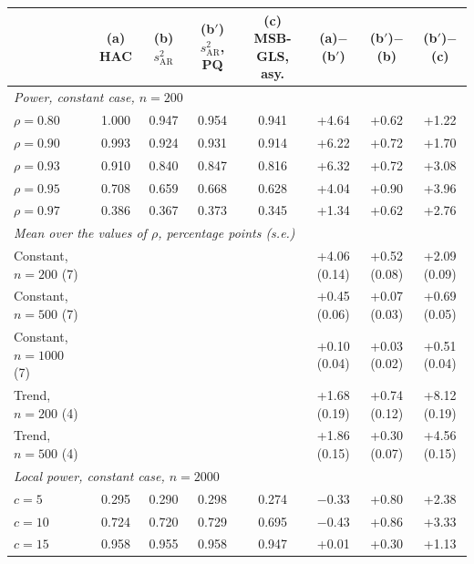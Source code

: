 \begin{tabular}{lccccccc}
\toprule
& (a) HAC & (b) $s^2_{\mathrm{AR}}$ & (b$'$) $s^2_{\mathrm{AR}}$, PQ & (c) MSB-GLS, asy. & (a)$-$(b$'$) & (b$'$)$-$(b) & (b$'$)$-$(c)\\
\midrule
\multicolumn{8}{l}{\emph{Power, constant case, $n = 200$}}\\
$\rho = 0.80$ & 1.000 & 0.947 & 0.954 & 0.941 & +4.64 & +0.62 & +1.22 \\
$\rho = 0.90$ & 0.993 & 0.924 & 0.931 & 0.914 & +6.22 & +0.72 & +1.70 \\
$\rho = 0.93$ & 0.910 & 0.840 & 0.847 & 0.816 & +6.32 & +0.72 & +3.08 \\
$\rho = 0.95$ & 0.708 & 0.659 & 0.668 & 0.628 & +4.04 & +0.90 & +3.96 \\
$\rho = 0.97$ & 0.386 & 0.367 & 0.373 & 0.345 & +1.34 & +0.62 & +2.76 \\
\multicolumn{8}{l}{\emph{Mean over the values of $\rho$, percentage points (s.e.)}}\\
Constant, $n = 200$ (7) &  &  &  &  & +4.06 (0.14) & +0.52 (0.08) & +2.09 (0.09) \\
Constant, $n = 500$ (7) &  &  &  &  & +0.45 (0.06) & +0.07 (0.03) & +0.69 (0.05) \\
Constant, $n = 1000$ (7) &  &  &  &  & +0.10 (0.04) & +0.03 (0.02) & +0.51 (0.04) \\
Trend, $n = 200$ (4) &  &  &  &  & +1.68 (0.19) & +0.74 (0.12) & +8.12 (0.19) \\
Trend, $n = 500$ (4) &  &  &  &  & +1.86 (0.15) & +0.30 (0.07) & +4.56 (0.15) \\
\multicolumn{8}{l}{\emph{Local power, constant case, $n = 2000$}}\\
$c = 5$ & 0.295 & 0.290 & 0.298 & 0.274 & $-$0.33 & +0.80 & +2.38 \\
$c = 10$ & 0.724 & 0.720 & 0.729 & 0.695 & $-$0.43 & +0.86 & +3.33 \\
$c = 15$ & 0.958 & 0.955 & 0.958 & 0.947 & +0.01 & +0.30 & +1.13 \\
\bottomrule
\end{tabular}
